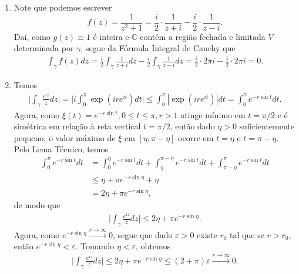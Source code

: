 \documentclass[12pt,a4paper]{article}
\begin{document}
\begin{enumerate}
		\item Note que podemos escrever
		$$
		f(z) = \frac{1}{z^2 + 1} = \frac{i}{2}\cdot\frac{1}{z+i} - \frac{i}{2}\cdot\frac{1}{z-i}.
		$$
		Daí, como $g(z)\equiv 1$ é inteira e $\mathbb{C}$ contém a região fechada e limitada $V$ determinada por $\gamma$, segue da Fórmula Integral de Cauchy que
		\begin{align*}
		\int_{\gamma}f(z) dz = \frac{i}{2}\int_{\gamma}\frac{1}{z+i} dz - \frac{i}{2}\int_{\gamma}\frac{1}{z-i} dz = \frac{i}{2}\cdot 2\pi i - \frac{i}{2}\cdot 2\pi i = 0.
		\end{align*}
		
		\item Temos
		\begin{align*}
		\Bigg| \int_{\gamma}\frac{e^{iz}}{z}dz \Bigg| = \Bigg| i\int_{0}^{\pi}\exp(ire^{it})dt \Bigg| \leq \int_{0}^{\pi} |\exp(ire^{it})| dt = \int_{0}^{\pi}e^{-r\sin t}dt.
		\end{align*}
		Agora, como $\xi(t) = e^{-r\sin t}, 0\leq t\leq \pi, r>1$ atinge mínimo em $t=\pi/2$ e é simétrica em relação à reta vertical $t=\pi/2$, então dado $\eta>0$ suficientemente pequeno, o valor máximo de $\xi$ em $[\eta, \pi - \eta]$ ocorre em $t = \eta$ e $t = \pi - \eta$. Pelo Lema Técnico, temos
		\begin{align*}
		\int_{0}^{\pi}e^{-r\sin t}dt &= \int_{0}^{\eta}e^{-r\sin t}dt + \int_{\eta}^{\pi - \eta}e^{-r\sin t}dt + \int_{\pi - \eta}^{\pi}e^{-r\sin t}dt \\
		&\leq \eta + \pi e^{-r\sin \eta} + \eta \\
		&= 2\eta + \pi e^{-r\sin\eta},
		\end{align*}  
		de modo que
		\begin{align*}
		\Bigg| \int_{\gamma}\frac{e^{iz}}{z}dz \Bigg| \leq 2\eta + \pi e^{-r\sin\eta}.
		\end{align*}
		Agora, como $e^{-r\sin \eta} \xrightarrow{r\to\infty} 0$, segue que dado $\varepsilon > 0$ existe $r_0$ tal que se $r>r_0$, então $e^{-r\sin\eta} < \varepsilon$. Tomando $\eta < \varepsilon$, obtemos
		\begin{align*}
		\Bigg| \int_{\gamma}\frac{e^{iz}}{z}dz \Bigg| \leq 2\eta + \pi e^{-r\sin\eta} \leq (2+\pi)\varepsilon \xrightarrow{r\to\infty} 0.
		\end{align*}
		

\end{enumerate}
\end{document}

